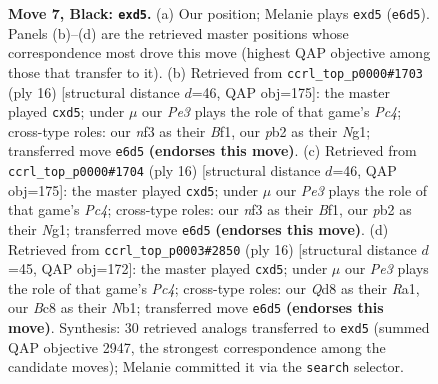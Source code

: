 \documentclass[11pt]{article}
\begin{document}
\begin{figure}[p]
\caption{\textbf{Move 7, Black: \texttt{exd5}.} (a) Our position; Melanie plays \texttt{exd5} (\texttt{e6d5}). Panels (b)--(d) are the retrieved master positions whose correspondence most drove this move (highest QAP objective among those that transfer to it). (b) Retrieved from \texttt{ccrl\_top\_p0000\#1703} (ply 16) [structural distance $d$=46, QAP obj=175]: the master played \texttt{cxd5}; under $\mu$ our \emph{Pe3} plays the role of that game's \emph{Pc4}; cross-type roles: our \emph{n}f3 as their \emph{B}f1, our \emph{p}b2 as their \emph{N}g1; transferred move \texttt{e6d5} \textbf{(endorses this move)}. (c) Retrieved from \texttt{ccrl\_top\_p0000\#1704} (ply 16) [structural distance $d$=46, QAP obj=175]: the master played \texttt{cxd5}; under $\mu$ our \emph{Pe3} plays the role of that game's \emph{Pc4}; cross-type roles: our \emph{n}f3 as their \emph{B}f1, our \emph{p}b2 as their \emph{N}g1; transferred move \texttt{e6d5} \textbf{(endorses this move)}. (d) Retrieved from \texttt{ccrl\_top\_p0003\#2850} (ply 16) [structural distance $d$=45, QAP obj=172]: the master played \texttt{cxd5}; under $\mu$ our \emph{Pe3} plays the role of that game's \emph{Pc4}; cross-type roles: our \emph{Q}d8 as their \emph{R}a1, our \emph{B}c8 as their \emph{N}b1; transferred move \texttt{e6d5} \textbf{(endorses this move)}. Synthesis: 30 retrieved analogs transferred to \texttt{exd5} (summed QAP objective 2947, the strongest correspondence among the candidate moves); Melanie committed it via the \texttt{search} selector.}
\label{fig:thought-m13}
\end{figure}

\clearpage
\end{document}
